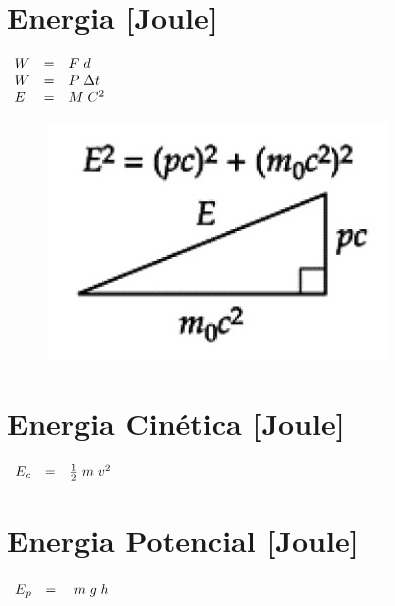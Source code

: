 \newline
\vspace{.6cm}
\newline
\begin{minipage}[c]{.5\linewidth}
	\section*{Energia [Joule]}
	\vspace{.1cm}
	\Large
	$\begin{array}{ l l l }
		W & = & F \; d \\
		W & = & P \; \Delta t \\
		E & = & M \; C^{2}
	\end{array}$
\end{minipage}
\begin{minipage}[c]{.5\linewidth}
	\begin{figure}[H]
		\flushleft
		\includegraphics[scale=0.6]{./image/General/Einstein.jpg}
		\caption*{\cite{book-2}}
		\label{Einstein}
	\end{figure}
\end{minipage}
\newline
\vspace{.6cm}
\newline
\begin{minipage}[!b]{.5\linewidth}
	\section*{Energia Cinética [Joule]}
	\Large
	$\begin{array}{ l l l }
		E_{c} & = & \frac{1}{2} \; m \; v^{2}
	\end{array}$
\end{minipage}
\begin{minipage}[!b]{.5\linewidth}
	\section*{Energia Potencial [Joule]}
	\Large
	$\begin{array}{ l l l }
		E_{p} & = & \; m \; g \; h
	\end{array}$
\end{minipage}
